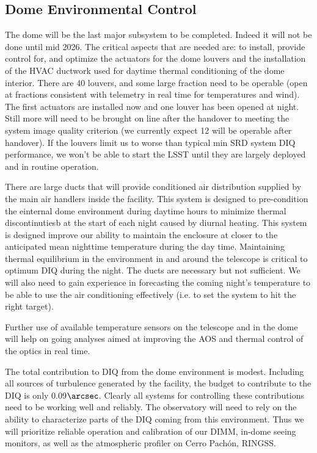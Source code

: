 \subsection{Dome Environmental Control}
The dome will be the last major subsystem to be completed. Indeed it will not be done until mid 2026. The critical aspects that are needed are: to install, provide control for, and optimize the actuators for the dome louvers and the installation of the HVAC ductwork used for daytime thermal conditioning of the dome interior. There are 40 louvers, and some large fraction need to be operable (open at fractions consistent with telemetry in real time for temperatures and wind). The first actuators are installed now and one louver has been opened at night. Still more will need to be brought on line after the handover to meeting the system image quality criterion (we currently expect 12 will be operable after handover). If the louvers limit us to worse than typical min SRD system DIQ performance, we won't be able to start the LSST until they are largely deployed and in routine operation. 

There are large ducts that will provide conditioned air distribution supplied by the main air handlers inside the facility. This system is designed to pre-condition the einternal dome environment during daytime hours to minimize thermal discontinutiesb at the start of each night caused by diurnal heating.  This system is designed improve our ability to maintain the enclosure at closer to the anticipated mean nighttime temperature during the day time. Maintaining thermal equilibrium in the environment in and around the telescope is critical to optimum DIQ during the night. The ducts are necessary but not sufficient. We will also need to gain experience in forecasting the coming night's temperature to be able to use the air conditioning effectively (i.e. to set the system to hit the right target). 

Further use of available temperature sensors on the telescope and in the dome will help on going analyses aimed at improving the AOS and thermal control of the optics in real time. 

The total contribution to DIQ from the dome environment is modest. Including all sources of turbulence generated by the facility, the budget to contribute to the DIQ is only 0.09$\arcsec$. Clearly all systems for controlling these contributions need to be working well and reliably. The observatory will need to rely on the ability to characterize parts of the DIQ coming from this environment. Thus we will prioritize reliable operation and calibration of our DIMM, in-dome seeing monitors, as well as the atmospheric profiler on Cerro Pach\'{on}, RINGSS.  

